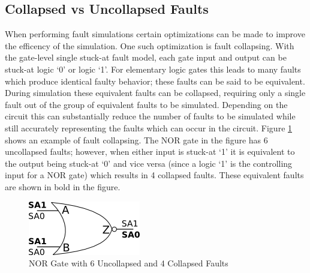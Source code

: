 \documentclass[12pt]{report}
\begin{document}
\subsection{Collapsed vs Uncollapsed Faults}
When performing fault simulations certain optimizations can be made to improve the efficency of the simulation.  One such optimization is fault collapsing.  With the gate-level single stuck-at fault model, each gate input and output can be stuck-at logic `0' or logic `1'.  For elementary logic gates this leads to many faults which produce identical faulty behavior; these faults can be said to be equivalent\cite{defectforcmos}.  During simulation these equivalent faults can be collapsed, requiring only a single fault out of the group of equivalent faults to be simulated\cite{defectforcmos}.  Depending on the circuit this can substantially reduce the number of faults to be simulated while still accurately representing the faults which can occur in the circuit\cite{defectforcmos}.  Figure \ref{fig:faultcollapse} shows an example of fault collapsing.  The NOR gate in the figure has 6 uncollapsed faults; however, when either input is stuck-at `1' it is equivalent to the output being stuck-at `0' and vice versa (since a logic `1' is the controlling input for a NOR gate) which results in 4 collapsed faults.  These equivalent faults are shown in bold in the figure.
\begin{figure}
	\begin{center}
		\includegraphics[scale=1]{images/nor-faultcollapse}
	\end{center}
  \caption{NOR Gate with 6 Uncollapsed and 4 Collapsed Faults}
  \label{fig:faultcollapse}
\end{figure}
\end{document}
